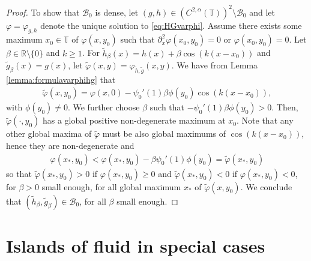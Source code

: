 \documentclass[11pt,reqno]{amsproc}
\newcommand{\R}{\mathbb{R}}
\numberwithin{equation}{section}
\numberwithin{theorem}{section}
\numberwithin{prop}{section}
\numberwithin{cor}{section}
\numberwithin{lemma}{section}
\theoremstyle{remark}
\theoremstyle{definition}
\begin{document}
\begin{proof}
To show that $\mathcal{B}_0$ is dense, let $(g,h)\in (C^{2,\alpha}(\mathbb{T}))^2 \setminus\mathcal{B}_0$ and let $\varphi=\varphi_{g,h}$ denote the unique solution to \eqref{eq:HGvarphi}. Assume there exists some maximum $x_0\in \mathbb{T}$ of $\varphi(x,y_0)$ such that $\partial_x^2\varphi(x_0,y_0)=0$ or $\varphi(x_0,y_0)=0$. Let $\beta\in \R\setminus \lbrace 0 \rbrace$ and $k\geq 1$. For $\widetilde{h}_\beta(x)  = h(x) + \beta\cos(k(x-x_0))$ and $\widetilde{g}_\beta(x)  = g(x)$, let $\widetilde{\varphi}(x,y)=\varphi_{\widetilde{h},\widetilde{g}}(x,y)$. We have from Lemma \ref{lemma:formulavarphihg} that
\begin{align*}
\widetilde{\varphi}(x,y_0) = \varphi(x,0) -\psi_0'(1)\beta\phi(y_0)\cos(k(x-x_0)),
\end{align*}
with $\phi(y_0)\neq 0$. We further choose $\beta$ such that $-\psi_0'(1)\beta\phi(y_0) >0$. Then, $\widetilde{\varphi}(\cdot,y_0)$ has a global positive non-degenerate maximum at $x_0$. Note that any other global maxima of $\widetilde{\varphi}$ must be also global maximums of $\cos(k(x-x_0))$, hence they are non-degenerate and
\begin{align*}
\varphi(x_*,y_0) < \varphi(x_*,y_0) - \beta\psi_0'(1)\phi(y_0)= \widetilde{\varphi}(x_*,y_0) 
\end{align*}
so that $\widetilde{\varphi}(x_*,y_0) >0$ if $\varphi(x_*,y_0)\geq 0$ and $\widetilde{\varphi}(x_*,y_0) <0$ if $\varphi(x_*,y_0)< 0$, for $\beta>0$ small enough, for all global maximum $x_*$ of $\widetilde{\varphi}(x,y_0)$.  We conclude that $(\widetilde{h}_\beta,\widetilde{g}_\beta)\in \mathcal{B}_0$, for all $\beta$ small enough. 
\end{proof}

\appendix
\section{Islands of fluid in special cases} \label{appendislands1}
\end{document}
